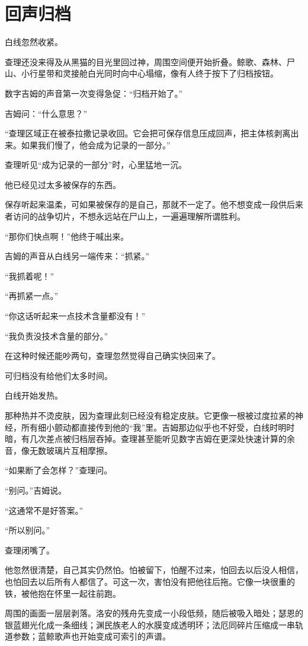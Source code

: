 \chapter{回声归档}

白线忽然收紧。

查理还没来得及从黑猫的目光里回过神，周围空间便开始折叠。鲸歌、森林、尸山、小行星带和灵接舱白光同时向中心塌缩，像有人终于按下了归档按钮。

数字吉姆的声音第一次变得急促：“归档开始了。”

吉姆问：“什么意思？”

“查理区域正在被泰拉撒记录收回。它会把可保存信息压成回声，把主体核剥离出来。如果我们慢了，他会成为记录的一部分。”

查理听见“成为记录的一部分”时，心里猛地一沉。

他已经见过太多被保存的东西。

保存听起来温柔，可如果被保存的是自己，那就不一定了。他不想变成一段供后来者访问的战争切片，不想永远站在尸山上，一遍遍理解所谓胜利。

“那你们快点啊！”他终于喊出来。

吉姆的声音从白线另一端传来：“抓紧。”

“我抓着呢！”

“再抓紧一点。”

“你这话听起来一点技术含量都没有！”

“我负责没技术含量的部分。”

在这种时候还能吵两句，查理忽然觉得自己确实快回来了。

可归档没有给他们太多时间。

白线开始发热。

那种热并不烫皮肤，因为查理此刻已经没有稳定皮肤。它更像一根被过度拉紧的神经，所有细小颤动都直接传到他的“我”里。吉姆那边似乎也不好受，白线时明时暗，有几次差点被归档层吞掉。查理甚至能听见数字吉姆在更深处快速计算的余音，像无数玻璃片互相摩擦。

“如果断了会怎样？”查理问。

“别问。”吉姆说。

“这通常不是好答案。”

“所以别问。”

查理闭嘴了。

他忽然很清楚，自己其实仍然怕。怕被留下，怕醒不过来，怕回去以后没人相信，也怕回去以后所有人都信了。可这一次，害怕没有把他往后拖。它像一块很重的铁，被他抱在怀里一起往前跑。

周围的画面一层层剥落。洛安的残舟先变成一小段低频，随后被吸入暗处；瑟恩的银蓝翅光化成一条细线；渊民族老人的水膜变成透明环；法厄同碎片压缩成一串轨道参数；蓝鲸歌声也开始变成可索引的声谱。

